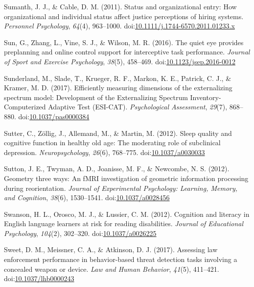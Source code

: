 \documentclass[english,man]{apa6}
\begin{document}
\hypertarget{ref-Sumanth2011}{}
Sumanth, J. J., \& Cable, D. M. (2011). Status and organizational entry:
How organizational and individual status affect justice perceptions of
hiring systems. \emph{Personnel Psychology}, \emph{64}(4), 963--1000.
doi:\href{https://doi.org/10.1111/j.1744-6570.2011.01233.x}{10.1111/j.1744-6570.2011.01233.x}

\hypertarget{ref-Sun2016}{}
Sun, G., Zhang, L., Vine, S. J., \& Wilson, M. R. (2016). The quiet eye
provides preplanning and online control support for interceptive task
performance. \emph{Journal of Sport and Exercise Psychology},
\emph{38}(5), 458--469.
doi:\href{https://doi.org/10.1123/jsep.2016-0012}{10.1123/jsep.2016-0012}

\hypertarget{ref-Sunderland2017}{}
Sunderland, M., Slade, T., Krueger, R. F., Markon, K. E., Patrick, C.
J., \& Kramer, M. D. (2017). Efficiently measuring dimensions of the
externalizing spectrum model: Development of the Externalizing Spectrum
Inventory-Computerized Adaptive Test (ESI-CAT). \emph{Psychological
Assessment}, \emph{29}(7), 868--880.
doi:\href{https://doi.org/10.1037/pas0000384}{10.1037/pas0000384}

\hypertarget{ref-Sutter2012}{}
Sutter, C., Zöllig, J., Allemand, M., \& Martin, M. (2012). Sleep
quality and cognitive function in healthy old age: The moderating role
of subclinical depression. \emph{Neuropsychology}, \emph{26}(6),
768--775. doi:\href{https://doi.org/10.1037/a0030033}{10.1037/a0030033}

\hypertarget{ref-Sutton2012}{}
Sutton, J. E., Twyman, A. D., Joanisse, M. F., \& Newcombe, N. S.
(2012). Geometry three ways: An fMRI investigation of geometric
information processing during reorientation. \emph{Journal of
Experimental Psychology: Learning, Memory, and Cognition}, \emph{38}(6),
1530--1541.
doi:\href{https://doi.org/10.1037/a0028456}{10.1037/a0028456}

\hypertarget{ref-Swanson2012}{}
Swanson, H. L., Orosco, M. J., \& Lussier, C. M. (2012). Cognition and
literacy in English language learners at risk for reading disabilities.
\emph{Journal of Educational Psychology}, \emph{104}(2), 302--320.
doi:\href{https://doi.org/10.1037/a0026225}{10.1037/a0026225}

\hypertarget{ref-Sweet2017}{}
Sweet, D. M., Meissner, C. A., \& Atkinson, D. J. (2017). Assessing law
enforcement performance in behavior-based threat detection tasks
involving a concealed weapon or device. \emph{Law and Human Behavior},
\emph{41}(5), 411--421.
doi:\href{https://doi.org/10.1037/lhb0000243}{10.1037/lhb0000243}
\end{document}
